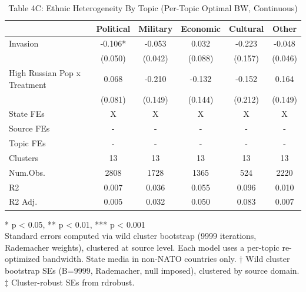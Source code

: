 \begin{table}[!t]
\caption{Table 4C: Ethnic Heterogeneity By Topic (Per-Topic Optimal BW, Continuous)} 
\fontsize{12.0pt}{14.4pt}\selectfont
\begin{tabular*}{\linewidth}{@{\extracolsep{\fill}}lccccc}
\toprule
  & Political & Military & Economic & Cultural & Other \\ 
\midrule\addlinespace[2.5pt]
Invasion & -0.106* & -0.053 & 0.032 & -0.223 & -0.048 \\ 
 & (0.050) & (0.042) & (0.088) & (0.157) & (0.046) \\ 
High Russian Pop x Treatment & 0.068 & -0.210 & -0.132 & -0.152 & 0.164 \\ 
{} & {(0.081)} & {(0.149)} & {(0.144)} & {(0.212)} & {(0.149)} \\ 
State FEs & X & X & X & X & X \\ 
Source FEs & - & - & - & - & - \\ 
Topic FEs & - & - & - & - & - \\ 
Clusters & 13 & 13 & 13 & 13 & 13 \\ 
Num.Obs. & 2808 & 1728 & 1365 & 524 & 2220 \\ 
R2 & 0.007 & 0.036 & 0.055 & 0.096 & 0.010 \\ 
R2 Adj. & 0.005 & 0.032 & 0.050 & 0.083 & 0.007 \\ 
\bottomrule
\end{tabular*}
\begin{minipage}{\linewidth}
* p < 0.05, ** p < 0.01, *** p < 0.001\\
Standard errors computed via wild cluster bootstrap (9999 iterations, Rademacher
weights), clustered at source level. Each model uses a per-topic re-optimized
bandwidth. State media in non-NATO countries only. † Wild cluster bootstrap SEs
(B=9999, Rademacher, null imposed), clustered by source domain. ‡ Cluster-robust
SEs from rdrobust.\\
\end{minipage}
\end{table}

